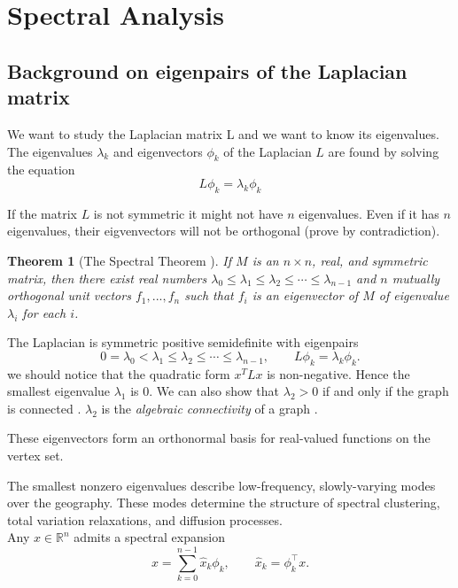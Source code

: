 \documentclass[11pt]{article}
\newtheorem{theorem}{Theorem}[section]
\begin{document}
\section{Spectral Analysis}\label{sec:spectral}

\subsection{Background on eigenpairs of the Laplacian matrix}\label{sec:eigen}


We want to study the Laplacian matrix L and we want to know its eigenvalues. The eigenvalues $\lambda_k$ and eigenvectors $\phi_k$ of the Laplacian $L$ are found by solving the equation
\[
L \phi_k = \lambda_k \phi_k
\]

If the matrix $L$ is not symmetric it might not have $n$ eigenvalues. Even if it has $n$ eigenvalues, their eigvenvectors will not be orthogonal (prove by contradiction).


\begin{theorem}[The Spectral Theorem \cite{}]
    If $M$ is an $n \times n$, real, and symmetric matrix, then there exist real numbers $\lambda_0 \leq \lambda_1 \leq \lambda_2 \leq \cdots \leq \lambda_{n-1}$ and $n$ mutually orthogonal unit vectors $f_1,...,f_n$ such that $f_i$ is an eigenvector of $M$ of eigenvalue $\lambda_i$ for each $i$.
\end{theorem} 

The Laplacian is symmetric positive semidefinite with eigenpairs
\[
0 = \lambda_0 < \lambda_1 \le \lambda_2 \le \cdots \le \lambda_{n-1},
\qquad
L\phi_k = \lambda_k \phi_k.
\]
we should notice that the quadratic form $x^T Lx$ is non-negative. Hence the smallest eigenvalue $\lambda_1$ is $0$. We can also show that $\lambda_2 > 0$ if and only if the graph is connected \cite{chung1997spectral}. 
$\lambda_2$ is the \textit{algebraic connectivity} of a graph \cite{fiedler1973algebraic}. 

These eigenvectors form an orthonormal basis for real-valued functions on the vertex set. 

The smallest nonzero eigenvalues describe low-frequency, slowly-varying modes over the geography. These modes determine the structure of spectral clustering, total variation relaxations, and diffusion processes. \\

 Any $x \in \mathbb{R}^n$ admits a spectral expansion
\[
x = \sum_{k=0}^{n-1} \hat{x}_k \phi_k,
\qquad
\hat{x}_k = \phi_k^\top x.
\]
\end{document}
